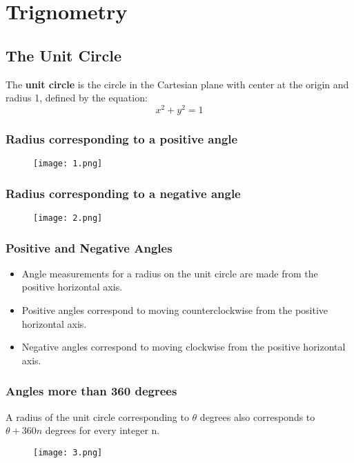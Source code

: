 \chapter{Trignometry}
\author{Nithin}

\section{The Unit Circle}
The \textbf{unit circle} is the circle in the Cartesian plane with center at the origin and radius 1, defined by the equation:
\[ x^2 + y^2 = 1 \]

\subsection{Radius corresponding to a positive angle}
\begin{figure}
    \centering
    \texttt{[image: 1.png]}
\end{figure}

\subsection{Radius corresponding to a negative angle}
\begin{figure}
    \centering
    \texttt{[image: 2.png]}
\end{figure}

\subsection{Positive and Negative Angles}
\begin{itemize}
    \item Angle measurements for a radius on the unit circle are made from the positive horizontal axis.
    \item Positive angles correspond to moving counterclockwise from the positive horizontal axis.
    \item Negative angles correspond to moving clockwise from the positive horizontal axis.
\end{itemize}

\subsection{Angles more than 360 degrees}
A radius of the unit circle corresponding to $\theta$ degrees also corresponds to $\theta + 360n$ degrees for every integer n.
\begin{figure}[h]
    \centering
    \texttt{[image: 3.png]}
\end{figure}

